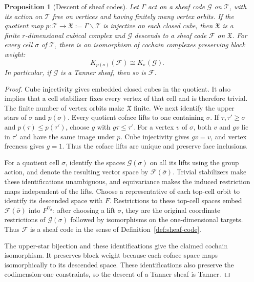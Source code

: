 \documentclass[11pt,letterpaper]{article}
\renewcommand{\le}{\leqslant}
\renewcommand{\ge}{\geqslant}
\newtheorem{proposition}[theorem]{Proposition}
\theoremstyle{definition}
\theoremstyle{remark}
\newcommand{\cF}{\mathcal F}
\newcommand{\X}{\mathfrak{X}}
\begin{document}
\begin{proposition}[Descent of sheaf codes]
\label{prop:tree-code-descent}
Let $\Gamma$ act on a sheaf code $\mathcal G$ on $\mathcal T$, with its action
on $\mathcal T$ free on vertices and having finitely many vertex
orbits. If the quotient map $p:\mathcal T\to\X:=\Gamma\backslash\mathcal T$
is injective on each closed cube, then $\X$ is a finite $r$-dimensional cubical
complex and $\mathcal G$ descends to a sheaf code $\cF$ on $\X$.
For every cell $\sigma$ of $\mathcal T$, there is an isomorphism
of cochain complexes preserving block weight:
\[
 K_{p(\sigma)}(\cF)\cong K_\sigma(\mathcal G).
\]
In particular, if $\mathcal G$ is a Tanner sheaf, then so is $\cF$.
\end{proposition}
\begin{proof}
Cube injectivity gives embedded closed cubes in the quotient.
It also implies that a cell stabilizer fixes every vertex of that cell and is therefore
trivial. The finite number of vertex orbits
make $\X$ finite. We next identify the upper stars of $\sigma$ and
$p(\sigma)$. Every quotient coface lifts to one containing $\sigma$.
If $\tau,\tau'\ge\sigma$ and $p(\tau)\le p(\tau')$, choose $g$
with $g\tau\le\tau'$. For a vertex $v$ of $\sigma$, both $v$ and
$gv$ lie in $\tau'$ and have the same image under $p$. Cube
injectivity gives $gv=v$, and vertex freeness gives $g=1$.
Thus the coface lifts are unique and preserve face inclusions.

For a quotient cell $\bar\sigma$, identify the spaces
$\mathcal G(\sigma)$ on all its lifts using the group action, and
denote the resulting vector space by $\cF(\bar\sigma)$.
Trivial stabilizers make these identifications unambiguous, and
equivariance makes the induced restriction maps independent of the lifts.
Choose a representative of each top-cell orbit to identify its
descended space with $F$. Restrictions to these top-cell spaces
embed $\cF(\bar\sigma)$ into $F^{U_{\bar\sigma}}$: after choosing
a lift $\sigma$, they are the original coordinate restrictions of
$\mathcal G(\sigma)$ followed by isomorphisms on the one-dimensional
targets. Thus $\cF$ is a sheaf code in the sense of
Definition~\ref{def:sheaf-code}.

The upper-star bijection and these identifications give the claimed
cochain isomorphism. It preserves block weight because each coface
space maps isomorphically to its descended space.
These identifications also preserve the codimension-one constraints,
so the descent of a Tanner sheaf is Tanner.
\end{proof}
\end{document}

